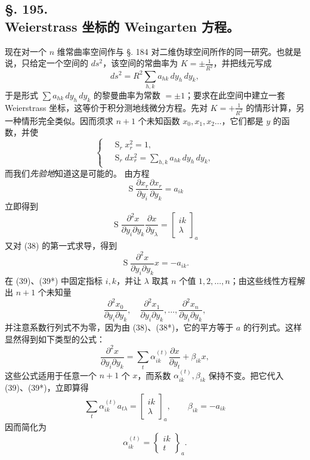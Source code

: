 \subsection*{§. 195.\\ Weierstrass 坐标的 Weingarten 方程。}

现在对一个 $n$ 维常曲率空间作与 §. 184 对二维伪球空间所作的同一研究。也就是说，只给定一个空间的 $ds^2$，该空间的常曲率为 $K=\pm\frac1{R^2}$，并把线元写成
\[
 ds^2=R^2\sum_{h,k}a_{hk}\,dy_h\,dy_k,
\]
于是形式 $\sum a_{hk}\,dy_h\,dy_k$ 的黎曼曲率为常数 $=\pm1$；要求在此空间中建立一套 Weierstrass 坐标，这等价于积分测地线微分方程。先对 $K=+\frac1{R^2}$ 的情形计算，另一种情形完全类似。因而须求 $n+1$ 个未知函数 $x_0,x_1,x_2\ldots$，它们都是 $y$ 的函数，并使
\[
\tag{38}
\left\{
\begin{aligned}
&\mathop{\mathrm{S}}_r x_r^2=1,\\
&\mathop{\mathrm{S}}_r dx_r^2=\sum_{h,k}a_{hk}\,dy_h\,dy_k,
\end{aligned}\right.
\]
而我们\emph{先验地}知道这是可能的。
由方程
\[
\tag{38*}
 \mathop{\mathrm{S}}\frac{\partial x_r}{\partial y_i}\frac{\partial x_r}{\partial y_k}=a_{ik}
\]
立即得到
\[
\tag{39}
 \mathop{\mathrm{S}}\frac{\partial^2x}{\partial y_i\partial y_k}\frac{\partial x}{\partial y_\lambda}
 =\left[\begin{matrix}ik\\ \lambda\end{matrix}\right]_a
\]
又对 (38) 的第一式求导，得到
\[
\tag{39*}
 \mathop{\mathrm{S}}\frac{\partial^2x}{\partial y_i\partial y_k}x=-a_{ik}.
\]
在 (39)、(39*) 中固定指标 $i,k$，并让 $\lambda$ 取其 $n$ 个值 $1,2,\ldots,n$；由这些线性方程解出 $n+1$ 个未知量
\[
 \frac{\partial^2x_0}{\partial y_i\partial y_k},\quad
 \frac{\partial^2x_1}{\partial y_i\partial y_k},\ldots,
 \frac{\partial^2x_n}{\partial y_i\partial y_k},
\]
并注意系数行列式不为零，因为由 (38)、(38*)，它的平方等于 $a$ 的行列式。这样显然得到如下类型的公式：
\[
 \frac{\partial^2x}{\partial y_i\partial y_k}=\sum_t\alpha^{(t)}_{ik}\frac{\partial x}{\partial y_t}+\beta_{ik}x,
\]
这些公式适用于任意一个 $n+1$ 个 $x$，而系数 $\alpha^{(t)}_{ik},\beta_{ik}$ 保持不变。把它代入 (39)、(39*)，立即算得
\[
 \sum_t\alpha^{(t)}_{ik}a_{t\lambda}=\left[\begin{matrix}ik\\ \lambda\end{matrix}\right]_a,
 \qquad \beta_{ik}=-a_{ik}
\]
因而简化为
\[
 \alpha^{(t)}_{ik}=\left\{\begin{matrix}ik\\ t\end{matrix}\right\}_a.
\]
